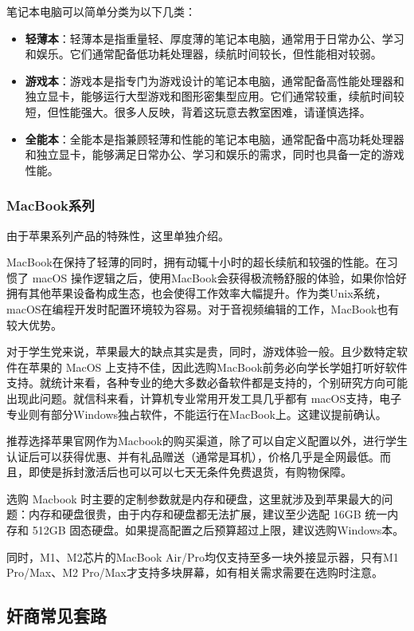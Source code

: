 \documentclass[../main.tex]{subfiles}
\begin{document}
笔记本电脑可以简单分类为以下几类：

\begin{itemize}
  \item \textbf{轻薄本}：轻薄本是指重量轻、厚度薄的笔记本电脑，通常用于日常办公、学习和娱乐。它们通常配备低功耗处理器，续航时间较长，但性能相对较弱。
  \item \textbf{游戏本}：游戏本是指专门为游戏设计的笔记本电脑，通常配备高性能处理器和独立显卡，能够运行大型游戏和图形密集型应用。它们通常较重，续航时间较短，但性能强大。很多人反映，背着这玩意去教室困难，请谨慎选择。
  \item \textbf{全能本}：全能本是指兼顾轻薄和性能的笔记本电脑，通常配备中高功耗处理器和独立显卡，能够满足日常办公、学习和娱乐的需求，同时也具备一定的游戏性能。
\end{itemize}

\subsubsection{MacBook系列}
由于苹果系列产品的特殊性，这里单独介绍。

MacBook在保持了轻薄的同时，拥有动辄十小时的超长续航和较强的性能。在习惯了 macOS 操作逻辑之后，使用MacBook会获得极流畅舒服的体验，如果你恰好拥有其他苹果设备构成生态，也会使得工作效率大幅提升。作为类Unix系统，macOS在编程开发时配置环境较为容易。对于音视频编辑的工作，MacBook也有较大优势。

对于学生党来说，苹果最大的缺点其实是贵，同时，游戏体验一般。且少数特定软件在苹果的 MacOS 上支持不佳，因此选购MacBook前务必向学长学姐打听好软件支持。就统计来看，各种专业的绝大多数必备软件都是支持的，个别研究方向可能出现此问题。就信科来看，计算机专业常用开发工具几乎都有 macOS支持，电子专业则有部分Windows独占软件，不能运行在MacBook上。这建议提前确认。

推荐选择苹果官网作为Macbook的购买渠道，除了可以自定义配置以外，进行学生认证后可以获得优惠、并有礼品赠送（通常是耳机），价格几乎是全网最低。而且，即使是拆封激活后也可以可以七天无条件免费退货，有购物保障。

选购 Macbook 时主要的定制参数就是内存和硬盘，这里就涉及到苹果最大的问题：内存和硬盘很贵，由于内存和硬盘都无法扩展，建议至少选配 16GB 统一内存和 512GB 固态硬盘。如果提高配置之后预算超过上限，建议选购Windows本。

同时，M1、M2芯片的MacBook Air/Pro均仅支持至多一块外接显示器，只有M1 Pro/Max、M2 Pro/Max才支持多块屏幕，如有相关需求需要在选购时注意。

\subsection{奸商常见套路}
\end{document}
